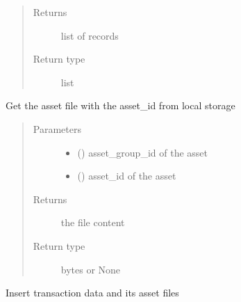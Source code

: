 \documentclass[letterpaper,10pt,english]{sphinxmanual}
\begin{document}
\begin{fulllineitems}
\begin{fulllineitems}
\begin{quote}
\begin{description}
\begin{itemize}
\end{itemize}

\item[{Returns}] \leavevmode
list of records

\item[{Return type}] \leavevmode
list

\end{description}\end{quote}

\end{fulllineitems}


\begin{fulllineitems}
\label{\detokenize{bbc1.core.data_handler:bbc1.core.data_handler.DataHandlerDomain0.get_in_storage}}
Get the asset file with the asset\_id from local storage
\begin{quote}\begin{description}
\item[{Parameters}] \leavevmode\begin{itemize}
\item {} 
 () \textendash{} asset\_group\_id of the asset

\item {} 
 () \textendash{} asset\_id of the asset

\end{itemize}

\item[{Returns}] \leavevmode
the file content

\item[{Return type}] \leavevmode
bytes or None

\end{description}\end{quote}

\end{fulllineitems}


\begin{fulllineitems}
\label{\detokenize{bbc1.core.data_handler:bbc1.core.data_handler.DataHandlerDomain0.insert_transaction}}
Insert transaction data and its asset files


\end{fulllineitems}
\end{fulllineitems}
\end{document}
